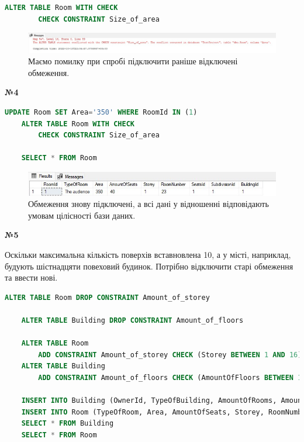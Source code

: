 \documentclass[a4paper,12pt]{article}
\begin{document}
\newpage
	\begin{lstlisting}[language=SQL]
	ALTER TABLE Room WITH CHECK
		CHECK CONSTRAINT Size_of_area
	\end{lstlisting}
	\begin{figure}[h!]
		\centering
		\begin{minipage}[h]{1.05\linewidth}
			\includegraphics[width=1\linewidth]{Prt sc/Figure_2.jpg}  
		\end{minipage}
		\caption{Маємо помилку при спробі підключити раніше відключені обмеження.}
	\end{figure}
	\begin{center}
		\textbf{№4}
	\end{center}
	\begin{lstlisting}[language=SQL]
	UPDATE Room SET Area='350' WHERE RoomId IN (1)
	ALTER TABLE Room WITH CHECK
		CHECK CONSTRAINT Size_of_area
		
	SELECT * FROM Room
	\end{lstlisting}
	\begin{figure}[h!]
		\centering
		\begin{minipage}[h]{1.05\linewidth}
			\includegraphics[width=1\linewidth]{Prt sc/Figure_3.jpg}  
		\end{minipage}
		\caption{Обмеження знову підключені, а всі дані у відношенні відповідають умовам цілісності бази даних.}
	\end{figure}
	\begin{center}
		\textbf{№5}
	\end{center}
	Оскільки максимальна кількість поверхів вставновлена 10, а у місті, наприклад, будують шістнадцяти повеховий будинок. Потрібно відключити старі обмеження та ввести нові.
	\begin{lstlisting}[language=SQL]
	ALTER TABLE Room DROP CONSTRAINT Amount_of_storey
	
	ALTER TABLE Building DROP CONSTRAINT Amount_of_floors
	
	ALTER TABLE Room
		ADD CONSTRAINT Amount_of_storey CHECK (Storey BETWEEN 1 AND 16)
	ALTER TABLE Building
		ADD CONSTRAINT Amount_of_floors CHECK (AmountOfFloors BETWEEN 1 AND 16)
	
	INSERT INTO Building (OwnerId, TypeOfBuilding, AmountOfRooms, AmountOfFloors) VALUES (1, 'Enterprise', 35, 15);
	INSERT INTO Room (TypeOfRoom, Area, AmountOfSeats, Storey, RoomNumber, SeatsId, SubdivisionId, BiuldingId) VALUES ('Pantry', 290, 70, 16, 29, 1, 1, 2);
	SELECT * FROM Building
	SELECT * FROM Room
	\end{lstlisting}
\end{document}
